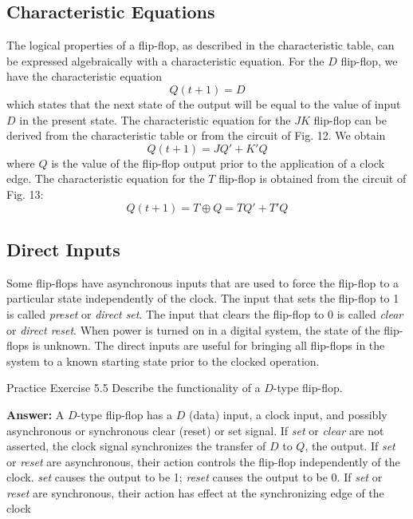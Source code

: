 \subsection{Characteristic Equations}
\label{subsec:char-equations}

The logical properties of a flip-flop, as described in the characteristic table, can be expressed algebraically with a characteristic equation. For the $D$ flip-flop, we have the characteristic equation
\begin{equation*}
  Q(t + 1) = D
\end{equation*}
which states that the next state of the output will be equal to the value of input $D$ in the present state. The characteristic equation for the $JK$ flip-flop can be derived from the characteristic table or from the circuit of Fig. 12. We obtain
\begin{equation*}
  Q(t + 1) = JQ' + K'Q
\end{equation*}
where $Q$ is the value of the flip-flop output prior to the application of a clock edge. The characteristic equation for the $T$ flip-flop is obtained from the circuit of Fig. 13:
\begin{equation*}
  Q(t + 1) = T \oplus Q = TQ' + T'Q
\end{equation*}


\subsection{Direct Inputs}
\label{subsec:direct-inputs}

Some flip-flops have asynchronous inputs that are used to force the flip-flop to a particular state independently of the clock. The input that sets the flip-flop to 1 is called \textit{preset} or \textit{direct set}. The input that clears the flip-flop to 0 is called \textit{clear} or \textit{direct reset}. When power is turned on in a digital system, the state of the flip-flops is unknown. The direct inputs are useful for bringing all flip-flops in the system to a known starting state prior to the clocked operation.

\begin{practice}{Practice Exercise 5.5}
Describe the functionality of a $D$-type flip-flop.

\textbf{Answer:} A $D$-type flip-flop has a $D$ (data) input, a clock input, and possibly asynchronous or synchronous clear (reset) or set signal. If \textit{set} or \textit{clear} are not asserted, the clock signal synchronizes the transfer of $D$ to $Q$, the output. If \textit{set} or \textit{reset} are asynchronous, their action controls the flip-flop independently of the clock. \textit{set} causes the output to be 1; \textit{reset} causes the output to be 0. If \textit{set} or \textit{reset} are synchronous, their action has effect at the synchronizing edge of the clock
\end{practice}

